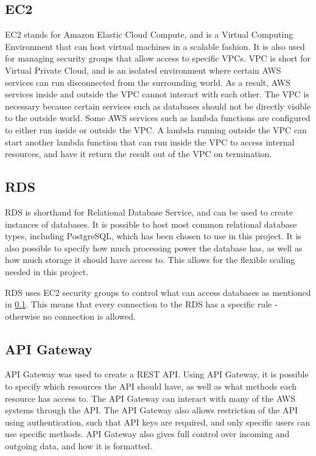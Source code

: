 \subsection{EC2}\label{ec2}
EC2 stands for Amazon Elastic Cloud Compute, and is a Virtual Computing Environment that can host virtual machines in a scalable fashion. It is also used for managing security groups that allow access to specific VPCs. VPC is short for Virtual Private Cloud, and is an isolated environment where certain AWS services can run disconnected from the surrounding world. As a result, AWS services inside and outside the VPC cannot interact with each other.
The VPC is necessary because certain services such as databases should not be directly visible to the outside world. Some AWS services such as lambda functions are configured to either run inside or outside the VPC. A lambda running outside the VPC can start another lambda function that can run inside the VPC to access internal resources, and have it return the result out of the VPC on termination.

\subsection{RDS}
RDS is shorthand for Relational Database Service, and can be used to create instances of databases. It is possible to host most common relational database types, including PostgreSQL, which has been chosen to use in this project. It is also possible to specify how much processing power the database has, as well as how much storage it should have access to. This allows for the flexible scaling needed in this project.

RDS uses EC2 security groups to control what can access databases as mentioned in \ref{ec2}. This means that every connection to the RDS has a specific rule - otherwise no connection is allowed. %

\subsection{API Gateway}
API Gateway was used to create a REST API. Using API Gateway, it is possible to specify which resources the API should have, as well as what methods each resource has access to. The API Gateway can interact with many of the AWS systems through the API. The API Gateway also allows restriction of the API using authentication, such that API keys are required, and only specific users can use specific methods. API Gateway also gives full control over incoming and outgoing data, and how it is formatted.

